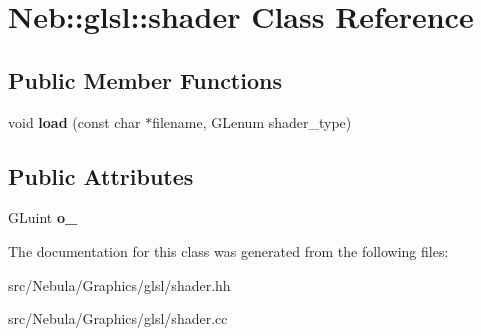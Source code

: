 \hypertarget{classNeb_1_1glsl_1_1shader}{\section{Neb\-:\-:glsl\-:\-:shader Class Reference}
\label{classNeb_1_1glsl_1_1shader}
}
\subsection*{Public Member Functions}
\begin{DoxyCompactItemize}
\item 
\hypertarget{classNeb_1_1glsl_1_1shader_aa0ae036b0adc5c8e21e87e1120bc813d}{void {\bfseries load} (const char $\ast$filename, G\-Lenum shader\-\_\-type)}\label{classNeb_1_1glsl_1_1shader_aa0ae036b0adc5c8e21e87e1120bc813d}

\end{DoxyCompactItemize}
\subsection*{Public Attributes}
\begin{DoxyCompactItemize}
\item 
\hypertarget{classNeb_1_1glsl_1_1shader_ac24c1c0ce93ef83fb0fa36862d003993}{G\-Luint {\bfseries o\-\_\-}}\label{classNeb_1_1glsl_1_1shader_ac24c1c0ce93ef83fb0fa36862d003993}

\end{DoxyCompactItemize}


The documentation for this class was generated from the following files\-:\begin{DoxyCompactItemize}
\item 
src/\-Nebula/\-Graphics/glsl/shader.\-hh\item 
src/\-Nebula/\-Graphics/glsl/shader.\-cc\end{DoxyCompactItemize}
